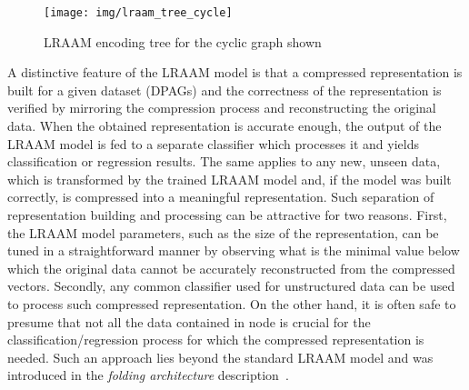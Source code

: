 \begin{figure}
\begin{center}
	\texttt{[image: img/lraam\_tree\_cycle]}
	\caption{LRAAM encoding tree for the cyclic graph shown}
	\label{fig:lraam_tree_cycle}
\end{center}
\end{figure}

A distinctive feature of the LRAAM model is that a compressed representation is built for a given dataset (DPAGs) and the correctness of the representation is verified by mirroring the compression process and reconstructing the original data. When the obtained representation is accurate enough, the output of the LRAAM model is fed to a separate classifier which processes it and yields classification or regression results. The same applies to any new, unseen data, which is transformed by the trained LRAAM model and, if the model was built correctly, is compressed into a meaningful representation. Such separation of representation building and processing can be attractive for two reasons. First, the LRAAM model parameters, such as the size of the representation, can be tuned in a straightforward manner by observing what is the minimal value below which the original data cannot be accurately reconstructed from the compressed vectors. Secondly, any common classifier used for unstructured data can be used to process such compressed representation. On the other hand, it is often safe to presume that not all the data contained in node is crucial for the classification/regression process for which the compressed representation is needed. Such an approach lies beyond the standard LRAAM model and was introduced in the \emph{folding architecture} description~\cite{kuchler1996inductive}.


